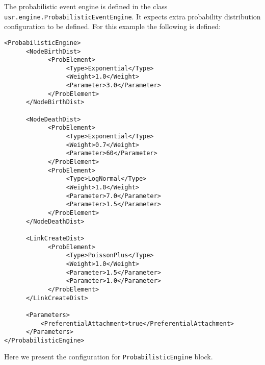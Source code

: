 \noindent The probabilistic event engine is defined in the class
\texttt{usr.engine.ProbabilisticEventEngine}.  It expects extra
probability distribution configuration to be defined. For this example
the following is defined:


\begin{lstlisting}[language=config, caption=probdists.xml]
<ProbabilisticEngine>
      <NodeBirthDist>
            <ProbElement>
                 <Type>Exponential</Type>
                 <Weight>1.0</Weight>
                 <Parameter>3.0</Parameter>
            </ProbElement>
      </NodeBirthDist>

      <NodeDeathDist>
            <ProbElement>
                 <Type>Exponential</Type>
                 <Weight>0.7</Weight>
                 <Parameter>60</Parameter>
            </ProbElement>
            <ProbElement>
                 <Type>LogNormal</Type>
                 <Weight>1.0</Weight>
                 <Parameter>7.0</Parameter>
                 <Parameter>1.5</Parameter>
            </ProbElement>
      </NodeDeathDist>

      <LinkCreateDist>
            <ProbElement>
                 <Type>PoissonPlus</Type>
                 <Weight>1.0</Weight>
                 <Parameter>1.5</Parameter>
                 <Parameter>1.0</Parameter>
            </ProbElement>
      </LinkCreateDist>

      <Parameters>
          <PreferentialAttachment>true</PreferentialAttachment>
      </Parameters>
</ProbabilisticEngine>
\end{lstlisting}


\noindent Here we present the configuration for \texttt{ProbabilisticEngine}
block.


